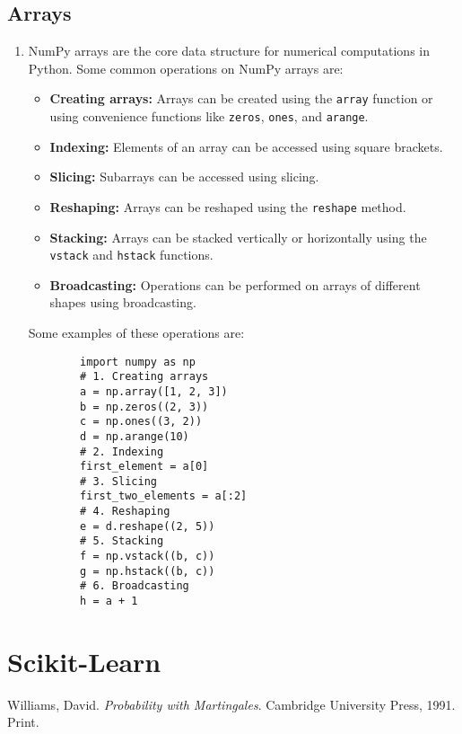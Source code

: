 \documentclass[letterpaper, 11pt]{article}
\newcommand{\1}{\mathds{1}}	%
\theoremstyle{definition}
\begin{document}
\subsection{Arrays}
\begin{enumerate}
    \item NumPy arrays are the core data structure for numerical computations in Python. Some common operations on NumPy arrays are:
    \begin{itemize}
        \item \textbf{Creating arrays:} Arrays can be created using the \texttt{array} function or using convenience functions like \texttt{zeros}, \texttt{ones}, and \texttt{arange}.
        \item \textbf{Indexing:} Elements of an array can be accessed using square brackets.
        \item \textbf{Slicing:} Subarrays can be accessed using slicing.
        \item \textbf{Reshaping:} Arrays can be reshaped using the \texttt{reshape} method.
        \item \textbf{Stacking:} Arrays can be stacked vertically or horizontally using the \texttt{vstack} and \texttt{hstack} functions.
        \item \textbf{Broadcasting:} Operations can be performed on arrays of different shapes using broadcasting.
    \end{itemize}
    Some examples of these operations are:
    \begin{verbatim}
        import numpy as np
        # 1. Creating arrays
        a = np.array([1, 2, 3])
        b = np.zeros((2, 3))
        c = np.ones((3, 2))
        d = np.arange(10)
        # 2. Indexing
        first_element = a[0]
        # 3. Slicing
        first_two_elements = a[:2]
        # 4. Reshaping
        e = d.reshape((2, 5))
        # 5. Stacking
        f = np.vstack((b, c))
        g = np.hstack((b, c))
        # 6. Broadcasting
        h = a + 1
    \end{verbatim}
\end{enumerate}

\section{Scikit-Learn}

\begin{thebibliography}{1}

   Williams, David.
   \textit{Probability with Martingales}.
   Cambridge University Press, 1991.
   Print.


\end{thebibliography}

\end{document}
